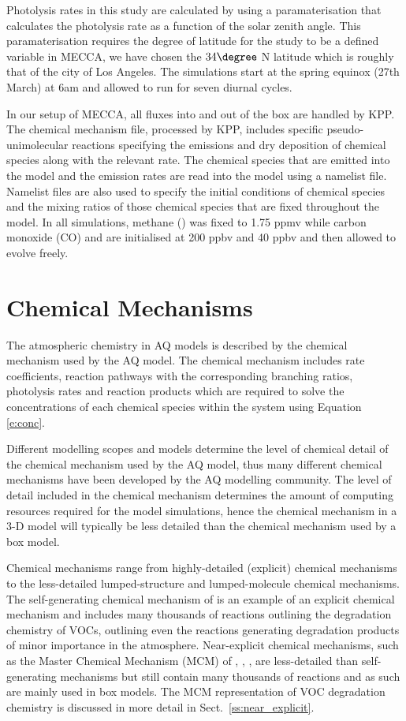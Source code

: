 Photolysis rates in this study are calculated by using a paramaterisation that calculates the photolysis rate as a function of the solar zenith angle.
This paramaterisation requires the degree of latitude for the study to be a defined variable in MECCA, we have chosen the $34\degree$ N latitude which is roughly that of the city of Los Angeles.
The simulations start at the spring equinox (27th March) at 6am and allowed to run for seven diurnal cycles.

In our setup of MECCA, all fluxes into and out of the box are handled by KPP.
The chemical mechanism file, processed by KPP, includes specific pseudo-unimolecular reactions specifying the emissions and dry deposition of chemical species along with the relevant rate.
The chemical species that are emitted into the model and the emission rates are read into the model using a namelist file.
Namelist files are also used to specify the initial conditions of chemical species and the mixing ratios of those chemical species that are fixed throughout the model.
In all simulations, methane () was fixed to 1.75 ppmv while carbon monoxide (CO) and  are initialised at 200 ppbv and 40 ppbv and then allowed to evolve freely.

\section{Chemical Mechanisms}
The atmospheric chemistry in AQ models is described by the chemical mechanism used by the AQ model. 
The chemical mechanism includes rate coefficients, reaction pathways with the corresponding branching ratios, photolysis rates and reaction products which are required to solve the concentrations of each chemical species within the system using Equation \eqref{e:conc}.

Different modelling scopes and models determine the level of chemical detail of the chemical mechanism used by the AQ model, thus many different chemical mechanisms have been developed by the AQ modelling community.
The level of detail included in the chemical mechanism determines the amount of computing resources required for the model simulations, hence the chemical mechanism in a 3-D model will typically be less detailed than the chemical mechanism used by a box model.

Chemical mechanisms range from highly-detailed (explicit) chemical mechanisms to the less-detailed lumped-structure and lumped-molecule chemical mechanisms.
The self-generating chemical mechanism of \citet{Aumont:2005} is an example of an explicit chemical mechanism and includes many thousands of reactions outlining the degradation chemistry of VOCs, outlining even the reactions generating degradation products of minor importance in the atmosphere.
Near-explicit chemical mechanisms, such as the Master Chemical Mechanism (MCM) of \citet{Jenkin:1997}, \citet{Jenkin:2003}, \citet{Saunders:2003}, are less-detailed than self-generating mechanisms but still contain many thousands of reactions and as such are mainly used in box models.
The MCM representation of VOC degradation chemistry is discussed in more detail in Sect.~\ref{ss:near_explicit}.

